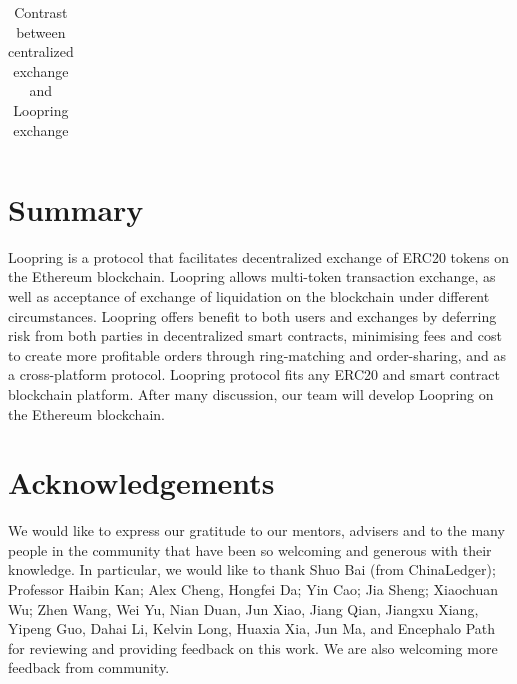 \documentclass[UTF8,nofonts]{article}
\begin{document}
\begin{table}[hbt]
\begin{tabular}{p{5cm}|p{2.5cm}|p{2.5cm}}
  \end{tabular}

\caption{Contrast between centralized exchange and Loopring exchange} %
\end{table}



\section{Summary\label{sec: summary}}

Loopring is a protocol that facilitates decentralized exchange of ERC20 tokens on the Ethereum blockchain. Loopring allows multi-token transaction exchange, as well as acceptance of exchange of liquidation on the blockchain under different circumstances. Loopring offers benefit to both users and exchanges by deferring risk from both parties in decentralized smart contracts, minimising fees and cost to create more profitable orders through ring-matching and order-sharing, and as a cross-platform protocol. Loopring protocol fits any ERC20 and smart contract blockchain platform. After many discussion,  our team will develop Loopring on the Ethereum blockchain.

\section{Acknowledgements\label{sec: acknowledgement}}

We would like to express our gratitude to our mentors, advisers and to the many people in the community that have been so welcoming and generous with their knowledge. In particular, we would like to thank Shuo Bai (from ChinaLedger); Professor Haibin Kan; Alex Cheng, Hongfei Da; Yin Cao; Jia Sheng; Xiaochuan Wu; Zhen Wang, Wei Yu, Nian Duan, Jun Xiao, Jiang Qian, Jiangxu Xiang, Yipeng Guo, Dahai Li, Kelvin Long, Huaxia Xia, Jun Ma, and Encephalo Path for reviewing and providing feedback on this work. We are also welcoming more feedback from community.

\newpage  


\end{document}
